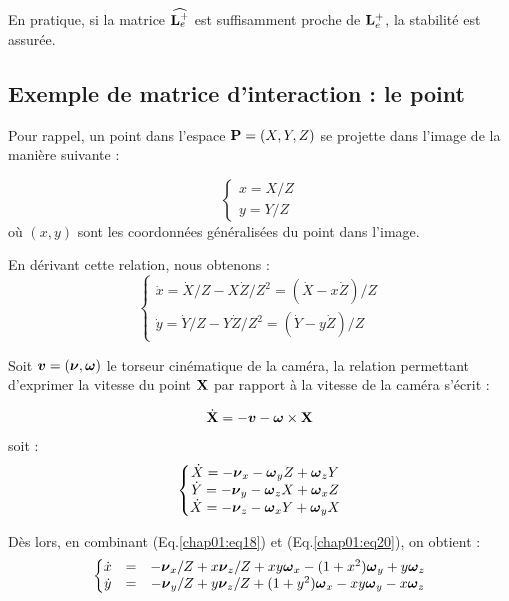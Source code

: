 En pratique, si la matrice $\widehat {{\bf L}^+_e}$ est suffisamment proche de 
${\bf L}^+_e$, la stabilit\'e est assur\'ee.


\subsection{Exemple de matrice d'interaction : le point} \label{chap1-2-1}

Pour rappel, un point dans l'espace ${\bf P} = (X, Y, Z)$ se projette dans 
l'image de la mani\`ere suivante :

\begin{equation}
\left \lbrace
\begin{matrix}
x = X/Z \\
y = Y/Z 
\end{matrix}
\right .
\label{chap01:eq19}
\end{equation}
o\`u $(x,y)$ sont les coordonn\'ees g\'en\'eralis\'ees du point dans l'image.

En d\'erivant cette relation, nous obtenons :
\begin{equation}
\left \lbrace
\begin{matrix}
\dot x = \dot X/Z - X \dot Z/Z^2  = (\dot X - x \dot Z)/Z \\
\dot y = \dot Y/Z - Y \dot Z/Z^2  = (\dot Y - y \dot Z)/Z 
\end{matrix}
\right .
\label{chap01:eq20}
\end{equation}

Soit $\hbox{\boldmath $v$} = (\hbox{\boldmath $\nu$}, \hbox{\boldmath $\omega$})$ le torseur cin\'ematique de la cam\'era, la 
relation permettant d'exprimer la vitesse du point ${\bf X}$ par rapport \`a la 
vitesse de la cam\'era s'\'ecrit :

\begin{equation}
\dot {\bf X} = -\hbox{\boldmath $v$} - \hbox{\boldmath $\omega$} \times {\bf X}
\label{chap01:eq19}
\end{equation}
soit :
\begin{equation}
\left \lbrace
\begin{matrix}
\dot X = -\hbox{\boldmath $\nu$}_x - \hbox{\boldmath $\omega$}_y Z + \hbox{\boldmath $\omega$}_z Y \\
\dot Y = -\hbox{\boldmath $\nu$}_y - \hbox{\boldmath $\omega$}_z X + \hbox{\boldmath $\omega$}_x Z \\
\dot X = -\hbox{\boldmath $\nu$}_z - \hbox{\boldmath $\omega$}_x Y + \hbox{\boldmath $\omega$}_y X \\
\end{matrix}
\right .
\label{chap01:eq21}
\end{equation}

D\`es lors, en combinant (Eq.\ref{chap01:eq18}) et (Eq.\ref{chap01:eq20}), on 
obtient :
\begin{equation}
\left \lbrace
\begin{matrix}
\dot x &=& -\hbox{\boldmath $\nu$}_x/Z +x\hbox{\boldmath $\nu$}_z/Z + xy\hbox{\boldmath $\omega$}_x -(1+x^2)\hbox{\boldmath $\omega$}_y + y \hbox{\boldmath $\omega$}_z \\
\dot y &=& -\hbox{\boldmath $\nu$}_y/Z +y\hbox{\boldmath $\nu$}_z/Z + (1+y^2)\hbox{\boldmath $\omega$}_x -xy\hbox{\boldmath $\omega$}_y - x \hbox{\boldmath $\omega$}_z
\end{matrix}
\right .
\label{chap01:eq22}
\end{equation}

